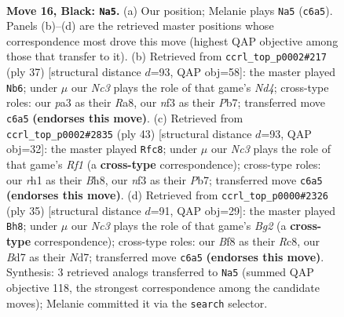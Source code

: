 \documentclass[11pt]{article}
\begin{document}
\begin{figure}[p]
\label{fig:thought-m29}
\end{figure}

\clearpage

\begin{figure}[p]\centering
\begin{subfigure}{0.46\textwidth}\centering
\resizebox{\linewidth}{!}{%
\newchessgame
\chessboard[
  setfen={2kr1bnr/pp1b4/2n1p1p1/1P1pP1Pp/3P4/P4N2/3K1P2/RNB2B1R b - - 0 16},
  showmover=false,
  pgfstyle=straightmove, color=movearrow, markmove={c6-a5}
]}
\caption{}
\end{subfigure}\hfill
\begin{subfigure}{0.46\textwidth}\centering
\resizebox{\linewidth}{!}{%
\newchessgame
\chessboard[
  setfen={r4rk1/pp1b1pb1/4p1pp/3n4/1n2PP2/NP3NP1/1P4BP/R1BR2K1 b - - 0 19},
  showmover=false,
  pgfstyle=straightmove, color=movearrow, markmove={d5-b6}
]}
\caption{}
\end{subfigure}
\\[4pt]
\begin{subfigure}{0.46\textwidth}\centering
\resizebox{\linewidth}{!}{%
\newchessgame
\chessboard[
  setfen={r4rkb/ppnnBp1p/4b1pP/2P1P3/8/2N2N2/P3BPP1/2R1K2R b K - 0 22},
  showmover=false,
  pgfstyle=straightmove, color=movearrow, markmove={f8-c8}
]}
\caption{}
\end{subfigure}\hfill
\begin{subfigure}{0.46\textwidth}\centering
\resizebox{\linewidth}{!}{%
\newchessgame
\chessboard[
  setfen={2rr1k2/pp1n1pbp/b5pP/2pN4/3PP3/4BN2/PP3PP1/R3K2R b KQ - 0 18},
  showmover=false,
  pgfstyle=straightmove, color=movearrow, markmove={g7-h8}
]}
\caption{}
\end{subfigure}
\caption{\textbf{Move 16, Black: \texttt{Na5}.} (a) Our position; Melanie plays \texttt{Na5} (\texttt{c6a5}). Panels (b)--(d) are the retrieved master positions whose correspondence most drove this move (highest QAP objective among those that transfer to it). (b) Retrieved from \texttt{ccrl\_top\_p0002\#217} (ply 37) [structural distance $d$=93, QAP obj=58]: the master played \texttt{Nb6}; under $\mu$ our \emph{Nc3} plays the role of that game's \emph{Nd4}; cross-type roles: our \emph{p}a3 as their \emph{R}a8, our \emph{n}f3 as their \emph{P}b7; transferred move \texttt{c6a5} \textbf{(endorses this move)}. (c) Retrieved from \texttt{ccrl\_top\_p0002\#2835} (ply 43) [structural distance $d$=93, QAP obj=32]: the master played \texttt{Rfc8}; under $\mu$ our \emph{Nc3} plays the role of that game's \emph{Rf1} (a \textbf{cross-type} correspondence); cross-type roles: our \emph{r}h1 as their \emph{B}h8, our \emph{n}f3 as their \emph{P}b7; transferred move \texttt{c6a5} \textbf{(endorses this move)}. (d) Retrieved from \texttt{ccrl\_top\_p0000\#2326} (ply 35) [structural distance $d$=91, QAP obj=29]: the master played \texttt{Bh8}; under $\mu$ our \emph{Nc3} plays the role of that game's \emph{Bg2} (a \textbf{cross-type} correspondence); cross-type roles: our \emph{B}f8 as their \emph{R}c8, our \emph{B}d7 as their \emph{N}d7; transferred move \texttt{c6a5} \textbf{(endorses this move)}. Synthesis: 3 retrieved analogs transferred to \texttt{Na5} (summed QAP objective 118, the strongest correspondence among the candidate moves); Melanie committed it via the \texttt{search} selector.}

\end{figure}
\end{document}
